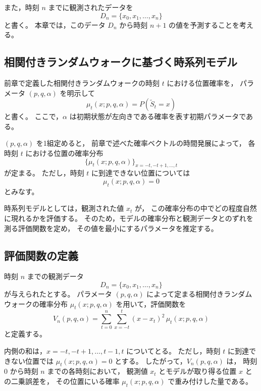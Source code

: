 \documentclass[a4j,dvipdfmx]{jsarticle}
\theoremstyle{plainnote}
\begin{document}
また，時刻 $n$ までに観測されたデータを
\begin{equation}
  D_n=\{x_0,x_1,\ldots,x_n\}
  \label{eq:model_Dn}
\end{equation}
と書く。
本章では，このデータ $D_n$ から時刻 $n+1$ の値を予測することを考える。

\subsection{相関付きランダムウォークに基づく時系列モデル}

前章で定義した相関付きランダムウォークの時刻 $t$ における位置確率を，
パラメータ $(p,q,\alpha)$ を明示して
\begin{equation}
  \mu_t(x;p,q,\alpha)
  =
  P(\tilde{S}_t=x)
  \label{eq:model_mu}
\end{equation}
と書く。
ここで，$\alpha$ は初期状態が左向きである確率を表す初期パラメータである。

$(p,q,\alpha)$ を1組定めると，
前章で述べた確率ベクトルの時間発展によって，
各時刻 $t$ における位置の確率分布
\[
  \{\mu_t(x;p,q,\alpha)\}_{x=-t,-t+1,\ldots,t}
\]
が定まる。
ただし，時刻 $t$ に到達できない位置については
\[
  \mu_t(x;p,q,\alpha)=0
\]
とみなす。

時系列モデルとしては，観測された値 $x_t$ が，
この確率分布の中でどの程度自然に現れるかを評価する。
そのため，モデルの確率分布と観測データとのずれを測る評価関数を定め，
その値を最小にするパラメータを推定する。

\subsection{評価関数の定義}

時刻 $n$ までの観測データ
\[
  D_n=\{x_0,x_1,\ldots,x_n\}
\]
が与えられたとする。
パラメータ $(p,q,\alpha)$ によって定まる相関付きランダムウォークの確率分布
$\mu_t(x;p,q,\alpha)$ を用いて，評価関数を
\begin{equation}
  V_n(p,q,\alpha)
  =
  \sum_{t=0}^{n}
  \sum_{x=-t}^{t}
  (x-x_t)^2\,
  \mu_t(x;p,q,\alpha)
  \label{eq:model_Vn}
\end{equation}
と定義する。

内側の和は，$x=-t,-t+1,\ldots,t-1,t$ についてとる。
ただし，時刻 $t$ に到達できない位置では
$\mu_t(x;p,q,\alpha)=0$ とする。
したがって，$V_n(p,q,\alpha)$ は，
時刻 $0$ から時刻 $n$ までの各時刻において，
観測値 $x_t$ とモデルが取り得る位置 $x$ との二乗誤差を，
その位置にいる確率 $\mu_t(x;p,q,\alpha)$ で重み付けした量である。
\end{document}
